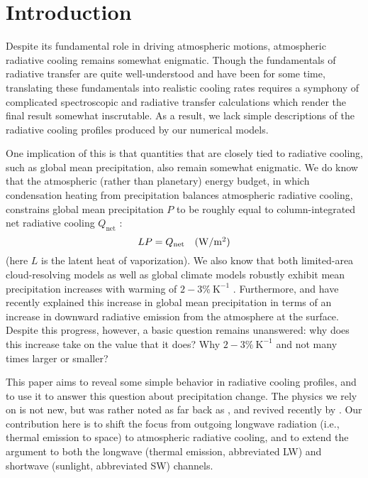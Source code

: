\documentclass[10pt]{article}
\newcommand{\beqn}{\begin{equation}}
\newcommand{\eeqn}{\end{equation}}
\newcommand{\Qnet}{\ensuremath{Q_\mathrm{net}}}
\newcommand{\Wmsq}{\ensuremath{\mathrm{W/m^2}}}
\newcommand{\Kinverse}{\ensuremath{\mathrm{K^{-1}}}}
\begin{document}
\section {Introduction}
Despite its fundamental role in driving atmospheric motions, atmospheric radiative cooling remains somewhat enigmatic. Though the fundamentals of radiative transfer are quite well-understood and have been for some time, translating these fundamentals into realistic cooling rates requires a symphony of complicated spectroscopic and radiative transfer calculations which render the final result somewhat inscrutable. As a result, we lack simple descriptions of the radiative cooling profiles produced by our numerical models.

One implication of this is that quantities that are closely tied to radiative cooling, such as global mean precipitation, also remain somewhat enigmatic. We do know that the atmospheric (rather than planetary) energy budget, in which condensation heating from precipitation balances atmospheric radiative cooling, constrains global mean precipitation $P$ to be roughly equal to column-integrated net radiative cooling $\Qnet$ \citep{ogorman2012,allen2002}:
\beqn
	LP = \Qnet \quad \mbox{(\Wmsq)} \label{rad_precip_constraint}
\eeqn
(here $L$ is the latent heat of vaporization). We also know that both limited-area cloud-resolving models as well as global climate models robustly exhibit  mean precipitation increases with warming of $2 -3\%\ \Kinverse$  \citep{stephens2008a, lambert2008, held2006}. Furthermore, \cite{stephens2010} and \cite{pendergrass2014}  have recently explained this increase in global mean precipitation in terms of an increase in downward radiative emission from the atmosphere at the surface. Despite this progress, however, a basic question remains unanswered: why does this increase take on the value that it does? Why $2 -3\%\ \Kinverse$ and not many times  larger or smaller?

This paper aims to reveal some simple behavior in radiative cooling profiles, and to use it to  answer this question about precipitation change. The physics we rely on is not new, but was rather noted as far back as \cite{simpson1928}, and revived recently by \cite{ingram2010}. Our contribution here is to shift the focus from outgoing longwave radiation (i.e., thermal emission to space) to atmospheric radiative cooling, and to extend the argument to both the longwave (thermal emission, abbreviated LW) and shortwave (sunlight, abbreviated SW) channels. 
\end{document}
